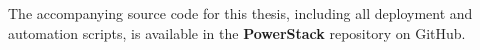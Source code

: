 The accompanying source code for this thesis, including all deployment and automation scripts, is available in the \textbf{PowerStack}\parencite{PowerStack} repository on GitHub.

